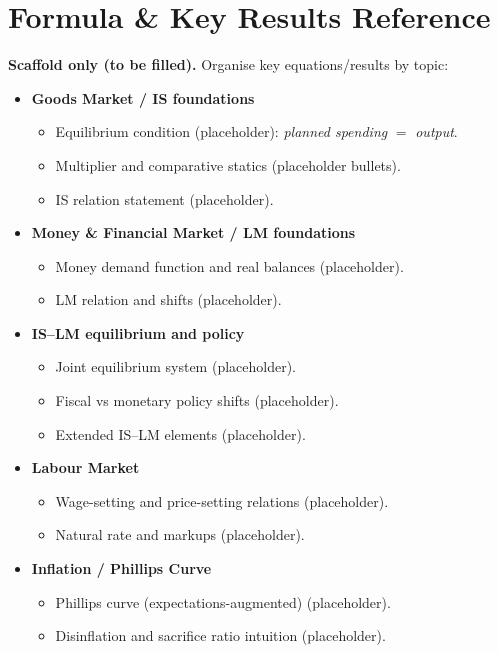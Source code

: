 \documentclass[12pt]{article}
\begin{document}


\appendix

\section{Formula & Key Results Reference}

\noindent\textbf{Scaffold only (to be filled).} Organise key equations/results by topic:

\begin{itemize}
\item \textbf{Goods Market / IS foundations}
\begin{itemize}
\item Equilibrium condition (placeholder): \textit{planned spending} $=$ \textit{output}.
\item Multiplier and comparative statics (placeholder bullets).
\item IS relation statement (placeholder).
\end{itemize}


\item \textbf{Money \& Financial Market / LM foundations}
\begin{itemize}
    \item Money demand function and real balances (placeholder).
    \item LM relation and shifts (placeholder).
\end{itemize}

\item \textbf{IS--LM equilibrium and policy}
\begin{itemize}
    \item Joint equilibrium system (placeholder).
    \item Fiscal vs monetary policy shifts (placeholder).
    \item Extended IS--LM elements (placeholder).
\end{itemize}

\item \textbf{Labour Market}
\begin{itemize}
    \item Wage-setting and price-setting relations (placeholder).
    \item Natural rate and markups (placeholder).
\end{itemize}

\item \textbf{Inflation / Phillips Curve}
\begin{itemize}
    \item Phillips curve (expectations-augmented) (placeholder).
    \item Disinflation and sacrifice ratio intuition (placeholder).
\end{itemize}


\end{itemize}
\end{document}
